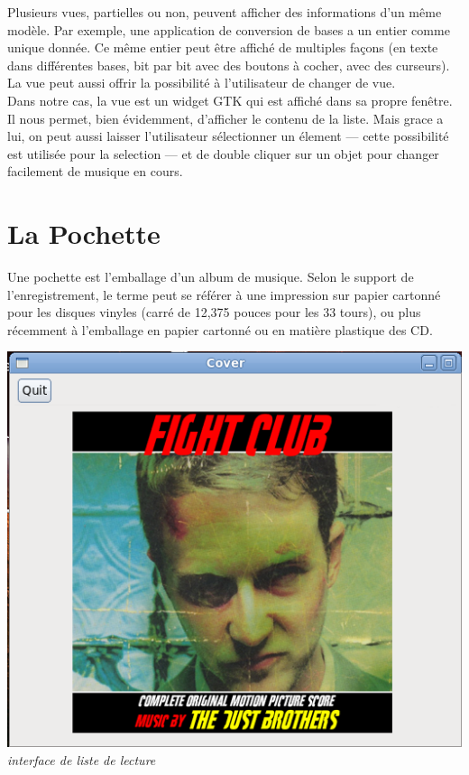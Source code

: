 \documentclass[12pt,a4paper]{report}
\begin{document}
Plusieurs vues, partielles ou non, peuvent afficher des informations d'un même modèle. Par exemple, une application de conversion de bases a un entier comme unique donnée. Ce même entier peut être affiché de multiples façons (en texte dans différentes bases, bit par bit avec des boutons à cocher, avec des curseurs). La vue peut aussi offrir la possibilité à l'utilisateur de changer de vue.\\

Dans notre cas, la vue est un widget GTK qui est affiché dans sa propre fenêtre. Il nous permet, bien évidemment, d'afficher le contenu de la liste. Mais grace a lui, on peut aussi laisser l'utilisateur sélectionner un élement --- cette possibilité est utilisée pour la selection --- et de double cliquer sur un objet pour changer facilement de musique en cours.\\

\chapter{La Pochette}

Une pochette est l'emballage d'un album de musique. Selon le support de l'enregistrement, le terme peut se référer à une impression sur papier cartonné pour les disques vinyles (carré de 12,375 pouces pour les 33 tours), ou plus récemment à l'emballage en papier cartonné ou en matière plastique des CD.

\begin{center}
\includegraphics[scale=0.7]{cover.png}
\it{interface de liste de lecture}
\end{center}
\end{document}
